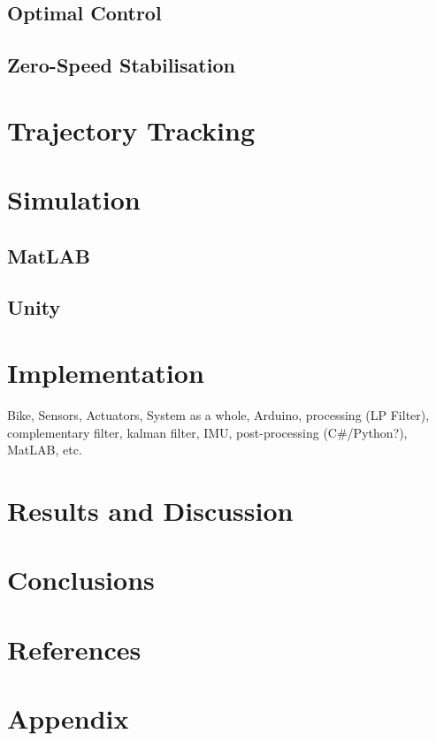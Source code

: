 \documentclass[a4paper]{article}
\begin{document}
\subsection{Optimal Control}

\subsection{Zero-Speed Stabilisation}

\section{Trajectory Tracking}

\section{Simulation}

\subsection{MatLAB}

\subsection{Unity}

\section{Implementation}

Bike, Sensors, Actuators, System as a whole, Arduino, processing (LP Filter), complementary filter, kalman filter, IMU, post-processing (C\#/Python?), MatLAB, etc.

\section{Results and Discussion}

\section{Conclusions}



\section{References}

\section{Appendix}
\end{document}
